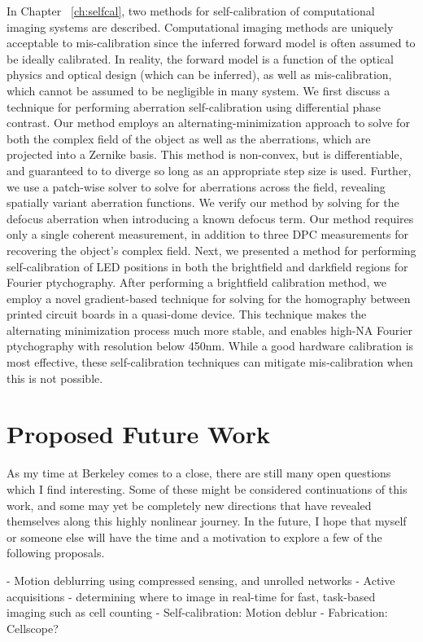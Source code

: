 In Chapter ~\ref{ch:selfcal}, two methods for self-calibration of computational imaging systems are described. Computational imaging methods are uniquely acceptable to mis-calibration since the inferred forward model is often assumed to be ideally calibrated. In reality, the forward model is a function of the optical physics and optical design (which can be inferred), as well as mis-calibration, which cannot be assumed to be negligible in many system. We first discuss a technique for performing aberration self-calibration using differential phase contrast. Our method employs an alternating-minimization approach to solve for both the complex field of the object as well as the aberrations, which are projected into a Zernike basis. This method is non-convex, but is differentiable, and guaranteed to to diverge so long as an appropriate step size is used. Further, we use a patch-wise solver to solve for aberrations across the field, revealing spatially variant aberration functions. We verify our method by solving for the defocus aberration when introducing a known defocus term. Our method requires only a single coherent measurement, in addition to three DPC measurements for recovering the object's complex field. Next, we presented a method for performing self-calibration of LED positions in both the brightfield and darkfield regions for Fourier ptychography. After performing a brightfield calibration method, we employ a novel gradient-based technique for solving for the homography between printed circuit boards in a quasi-dome device. This technique makes the alternating minimization process much more stable, and enables high-NA Fourier ptychography with resolution below 450nm. While a good hardware calibration is most effective, these self-calibration techniques can mitigate mis-calibration when this is not possible.

\section{Proposed Future Work}
As my time at Berkeley comes to a close, there are still many open questions which I find interesting. Some of these might be considered continuations of this work, and some may yet be completely new directions that have revealed themselves along this highly nonlinear journey. In the future, I hope that myself or someone else will have the time and a motivation to explore a few of the following proposals.

- Motion deblurring using compressed sensing, and unrolled networks
- Active acquisitions - determining where to image in real-time for fast, task-based imaging such as cell counting
- Self-calibration: Motion deblur
- Fabrication: Cellscope?


